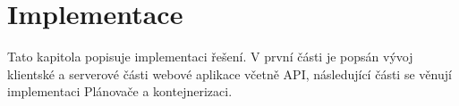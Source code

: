 \chapter{Implementace}

Tato kapitola popisuje implementaci řešení. V první části je popsán vývoj klientské a serverové části webové aplikace včetně API, následující části se 
věnují implementaci Plánovače a kontejnerizaci.




